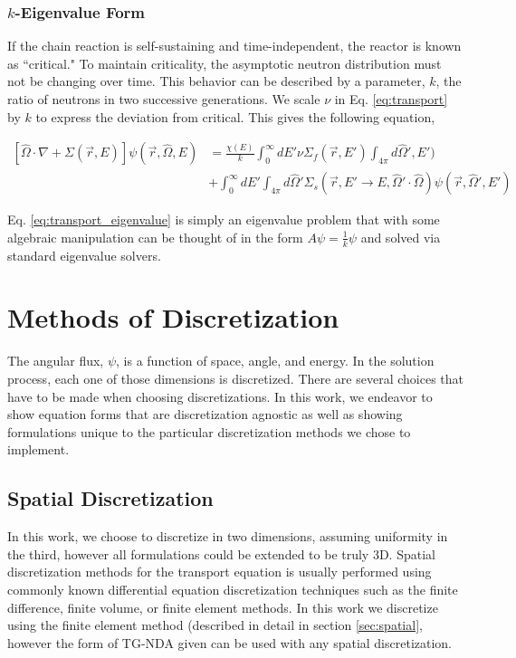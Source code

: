 \subsubsection{$k$-Eigenvalue Form}
If the chain reaction is self-sustaining and time-independent, the reactor is known as ``critical." To maintain criticality, the asymptotic neutron distribution must not be changing over time. This behavior can be described by a parameter,  $k$, the ratio of neutrons in two successive generations. We scale $\nu$ in Eq. \ref{eq:transport} by $k$ to express the deviation from critical. This gives the following equation,

\begin{equation}
    \label{eq:transport_eigenvalue}
    \begin{split}
        [\hat{\Omega} \cdot \nabla + \Sigma(\vec{r}, E)]\psi(\vec{r}, \hat{\Omega}, E) &= \frac{\chi(E)}{k} \int_0^\infty dE' \nu \Sigma_{f}(\vec{r}, E') \int_{4\pi} d\hat{\Omega}', E') \\ &+ \int_0^\infty dE' \int_{4\pi} d\hat{\Omega}' \Sigma_s(\vec{r}, E' \rightarrow E, \hat{\Omega}' \cdot \hat{\Omega})\psi(\vec{r}, \hat{\Omega}', E') 
    \end{split}
\end{equation}

Eq. \ref{eq:transport_eigenvalue} is simply an eigenvalue problem that with some algebraic manipulation can be thought of in the form $A\psi = \frac{1}{k} \psi$ and solved via standard eigenvalue solvers. 

\section{Methods of Discretization}
The angular flux, $\psi$, is a function of space, angle, and energy. In the solution process, each one of those dimensions is discretized. There are several choices that have to be made when choosing discretizations. In this work, we endeavor to show equation forms that are discretization agnostic as well as showing formulations unique to the particular discretization methods we chose to implement. 
\subsection{Spatial Discretization}
In this work, we choose to discretize in two dimensions, assuming uniformity in the third, however all formulations could be extended to be truly 3D. Spatial discretization methods for the transport equation is usually performed using commonly known differential equation discretization techniques such as the finite difference, finite volume, or finite element methods. In this work we discretize using the finite element method (described in detail in section \ref{sec:spatial}, however the form of TG-NDA given can be used with any spatial discretization. 

